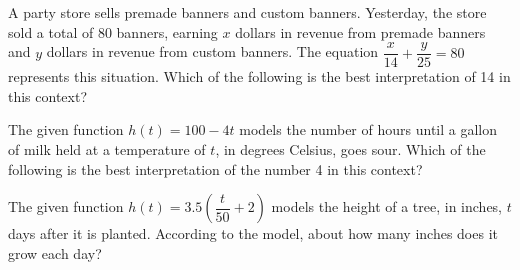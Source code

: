A party store sells premade banners and custom banners. Yesterday, the store sold a total of 80 banners, earning $x$ dollars in revenue from premade banners and $y$ dollars in revenue from custom banners. The equation $\dfrac{x}{14} + \dfrac{y}{25} = 80$ represents this situation. Which of the following is the best interpretation of 14 in this context?

\vspace{0.75em}


\vspace{2em}

\noindent\markforreview
\vspace{1em}

The given function $h(t) = 100 - 4t$ models the number of hours until a gallon of milk held at a temperature of $t$, in degrees Celsius, goes sour. Which of the following is the best interpretation of the number 4 in this context?

\vspace{0.75em}


\vspace{2em}

\noindent\markforreview
\vspace{1em}

The given function $h(t) = 3.5\left(\dfrac{t}{50} + 2\right)$ models the height of a tree, in inches, $t$ days after it is planted. According to the model, about how many inches does it grow each day?

\vspace{0.75em}


\vspace{2em}

